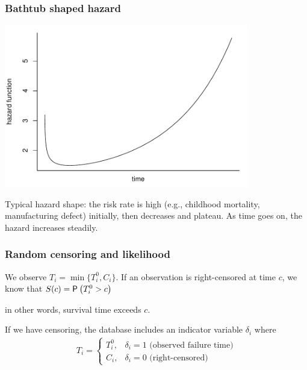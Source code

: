 \documentclass{beamer}
\begin{document}
\begin{frame}
\frametitle{Bathtub shaped hazard}
\begin{center}
\includegraphics[width = 0.8\textwidth]{img/c7/07-bathtub-hazard.pdf}
\end{center}
{\footnotesize
Typical hazard shape: the risk rate is high (e.g., childhood mortality, manufacturing defect) initially, then decreases and plateau. As time goes on, the hazard increases steadily.

}
\end{frame}

\begin{frame}
\frametitle{Random censoring and likelihood}
We observe $T_i = \min\{T_i^0, C_i\}$. If an observation is right-censored at time $c$, we know that $S(c)=\P{T_i^0 > c}$
\bi \item in other words, survival time exceeds $c$.
\ei

If we have censoring, the database includes an indicator variable $\delta_i$ where
\begin{align*}
T_i = 
\begin{cases}
T_i^0, & \delta_i=1 \text{ (observed failure time)}\\
C_i, & \delta_i=0 \text{ (right-censored)}
\end{cases}
\end{align*}
\end{frame}
\end{document}
